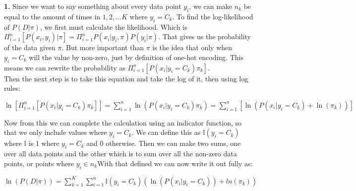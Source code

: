 \documentclass[submit]{harvardml}
\begin{document}
 \newpage 
 \textbf{1.} Since we want to say something about every data point $y_i$, we can make $n_k$ be equal to the amount of times in ${1,2, ... K}$ where $y_i = C_k$. 
 To find the log-likelihood of $P(D | \pi)$, we first must calculate the likelihood. Which is $\Pi_{i=1}^n [P(x_i, y_i) | \pi] = \Pi_{i=1}^n P(x_i | y_i, \pi) P(y_i | \pi)$.
 That gives us the probability of the data given $\pi$. But more important than $\pi$ is the idea that only when $y_i = C_k$ will the value by non-zero, just by definition of one-hot encoding.
 This means we can rewrite the probability as $\Pi_{i=1}^n [P(x_i | y_i = C_k)\pi_k]$. \\
 Then the next step is to take this equation and take the log of it, then using log rules: 
 \begin{center}
  $\ln[\Pi_{i=1}^n [P(x_i | y_i = C_k)\pi_k]] = \sum_{i=1}^{n} \ln(P(x_i|y_i = C_k)\pi_k) = \sum_{i=1}^{n} [\ln(P(x_i|y_i = C_k) + \ln(\pi_k))]$
 \end{center}
 Now from this we can complete the calculation using an indicator function, so that we only include values where $y_i = C_k$. We can define this as $\mathbb{I}(y_i = C_k)$ where $\mathbb{I}$ is 1 where $y_i = C_k$ and 0 otherwise.
 Then we can make two sums, one over all data points and the other which is to sum over all the non-zero data points, or points where $y_i \in n_k$With that defined we can now write it out fully as: 
 \begin{center}
    $\ln(P(D | \pi)) = \sum_{k=1}^{K} \sum_{i=1}^{n} \mathbb{I}(y_i = C_k)(\ln(P(x_i | y_i = C_k)) + ln(\pi_k))$
 \end{center}
\end{document}
